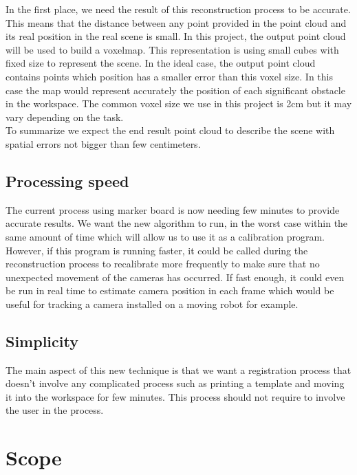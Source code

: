 In the first place, we need the result of this reconstruction process to be accurate. This means that the distance between any point provided in the point cloud and its real position in the real scene is small. In this project, the output point cloud will be used to build a voxelmap. This representation is using small cubes with fixed size to represent the scene. In the ideal case, the output point cloud contains points which position has a smaller error than this voxel size. In this case the map would represent accurately the position of each significant obstacle in the workspace. The common voxel size we use in this project is 2cm but it may vary depending on the task. \\
To summarize we expect the end result point cloud to describe the scene with spatial errors not bigger than few centimeters. 

\subsection{Processing speed}

The current process using marker board is now needing few minutes to provide accurate results. We want the new algorithm to run, in the worst case within the same amount of time which will allow us to use it as a calibration program. However, if this program is running faster, it could be called during the reconstruction process to recalibrate more frequently to make sure that no unexpected movement of the cameras has occurred. If fast enough, it could even be run in real time to estimate camera position in each frame which would be useful for tracking a camera installed on a moving robot for example.

\subsection{Simplicity}

The main aspect of this new technique is that we want a registration process that doesn't involve any complicated process such as printing a template and moving it into the workspace for few minutes. This process should not require to involve the user in the process.

\section{Scope}

